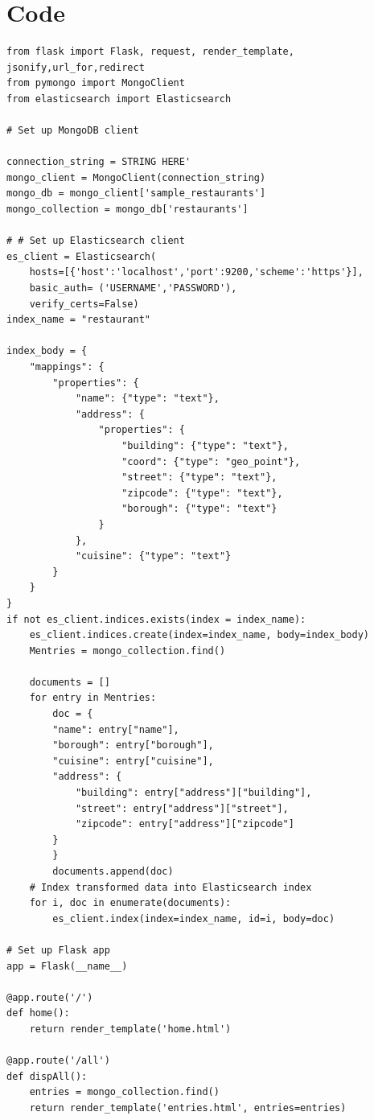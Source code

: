 \documentclass[12pt]{article}
\begin{document}
\section{Code}
\begin{verbatim}
from flask import Flask, request, render_template, jsonify,url_for,redirect
from pymongo import MongoClient
from elasticsearch import Elasticsearch

# Set up MongoDB client

connection_string = STRING HERE'
mongo_client = MongoClient(connection_string)
mongo_db = mongo_client['sample_restaurants']
mongo_collection = mongo_db['restaurants']

# # Set up Elasticsearch client
es_client = Elasticsearch(
    hosts=[{'host':'localhost','port':9200,'scheme':'https'}],
    basic_auth= ('USERNAME','PASSWORD'),
    verify_certs=False)
index_name = "restaurant"

index_body = {
    "mappings": {
        "properties": {
            "name": {"type": "text"},
            "address": {
                "properties": {
                    "building": {"type": "text"},
                    "coord": {"type": "geo_point"},
                    "street": {"type": "text"},
                    "zipcode": {"type": "text"},
                    "borough": {"type": "text"}
                }
            },
            "cuisine": {"type": "text"}
        }
    }
}
if not es_client.indices.exists(index = index_name):
    es_client.indices.create(index=index_name, body=index_body)
    Mentries = mongo_collection.find()
    
    documents = []
    for entry in Mentries:
        doc = {
        "name": entry["name"],
        "borough": entry["borough"],
        "cuisine": entry["cuisine"],
        "address": {
            "building": entry["address"]["building"],
            "street": entry["address"]["street"],
            "zipcode": entry["address"]["zipcode"]            
        }
        }
        documents.append(doc)
    # Index transformed data into Elasticsearch index
    for i, doc in enumerate(documents):
        es_client.index(index=index_name, id=i, body=doc)

# Set up Flask app
app = Flask(__name__)

@app.route('/')
def home():
    return render_template('home.html')

@app.route('/all')
def dispAll():
    entries = mongo_collection.find()
    return render_template('entries.html', entries=entries)


\end{verbatim}
\end{document}
